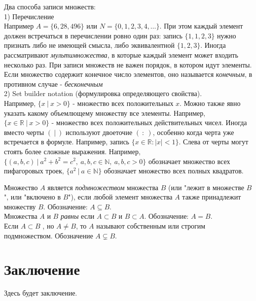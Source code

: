     \par Два способа записи множеств: 
    \\
    1) Перечисление   
    \\
    Например $A = \{6, 28, 496\}$  или $N = \{0,1,2,3,4,\ldots\}$. При этом каждый элемент должен встречаться в перечислении ровно один раз: запись $\{1,1,2,3\}$ нужно признать либо не имеющей смысла, либо эквивалентной $\{1,2,3\}$. Иногда рассматривают \textit{мультимножества}, в которые каждый элемент может входить несколько раз. При записи множеств не важен порядок, в котором идут элементы. 
    Если множество содержит конечное число элементов, оно называется \textit{конечным}, в противном случае - \textit{бесконечным}
    \\
    2) Set builder notation (формулировка определяющего свойства). 
    \\
    Например, $\{x \ | \ x > 0\}$ - множество всех положительных  $x$. Можно также явно указать какому объемлющему множеству  все элементы. Например, $\{x\in \mathbb{R} \ | \ x>0\}$ - множество всех положительных действительных чисел. Иногда вместо черты $( \ | \ )$ используют двоеточие $( \ : \ )$, особенно когда черта уже встречается в формуле.  Например, запись $\{x\in \mathbb{R} : |x| < 1\}$. Слева от черты могут стоять более сложные выражения. Например, $\{(a,b,c) \ | \ a^2 + b^2  = c^2, \ a,b,c \in  \mathbb{N}, \ a,b,c>0\}$ обозначает множество всех пифагоровых троек, $\{a^2 \ | \ a \in \mathbb{N}\}$ обозначает множество всех полных квадратов.
    
    \begin{definition}
    Множество $A$ является \textit{подмножеством} множества $B$ (или "лежит в множестве $B$", или "включено в $B$"), если любой элемент множества $A$ также принадлежит множеству $B$. Обозначение: $A \subseteq B$. 
    \\
    Множества $A$ и $B$ \textit{равны} если $A \subset B$ и $B \subset A$.  Обозначение: $A = B$. 
    \\
    Если $A \subset B$ , но $A \ne B$, то $A$ называют собственным или строгим подмножеством. Обозначение $A \subsetneq  B$.
    \end{definition}
    
	\clearpage

	\section{Заключение}
	Здесь будет заключение.
	
	
	
